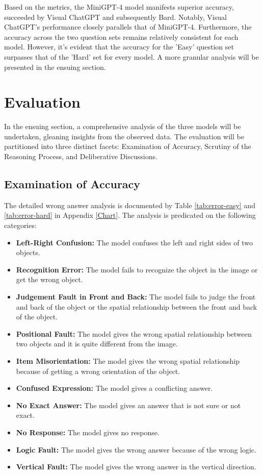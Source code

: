 \documentclass[twocolumn,11pt]{report}
\begin{document}
Based on the metrics, the MiniGPT-4 model manifests superior accuracy, succeeded by Visual ChatGPT and subsequently Bard. Notably, Visual ChatGPT's performance closely parallels that of MiniGPT-4. Furthermore, the accuracy across the two question sets remains relatively consistent for each model. However, it's evident that the accuracy for the 'Easy' question set surpasses that of the 'Hard' set for every model. A more granular analysis will be presented in the ensuing section.

\section{Evaluation}
In the ensuing section, a comprehensive analysis of the three models will be undertaken, gleaning insights from the observed data. The evaluation will be partitioned into three distinct facets: Examination of Accuracy, Scrutiny of the Reasoning Process, and Deliberative Discussions.

\subsection{Examination of Accuracy}
The detailed wrong answer analysis is documented by Table \ref{tab:error-easy} and \ref{tab:error-hard} in Appendix \ref{Chart}. The analysis is predicated on the following categories:
\begin{itemize}
    \item \textbf{Left-Right Confusion:} The model confuses the left and right sides of two objects.
    \item \textbf{Recognition Error:} The model fails to recognize the object in the image or get the wrong object.
    \item \textbf{Judgement Fault in Front and Back:} The model fails to judge the front and back of the object or the spatial relationship between the front and back of the object.
    \item \textbf{Positional Fault:} The model gives the wrong spatial relationship between two objects and it is quite different from the image.
    \item \textbf{Item Misorientation:} The model gives the wrong spatial relationship because of getting a wrong orientation of the object.
    \item \textbf{Confused Expression:} The model gives a conflicting answer.
    \item \textbf{No Exact Answer:} The model gives an answer that is not sure or not exact.
    \item \textbf{No Response:} The model gives no response.
    \item \textbf{Logic Fault:} The model gives the wrong answer because of the wrong logic.
    \item \textbf{Vertical Fault:} The model gives the wrong answer in the vertical direction.
\end{itemize}
\end{document}
